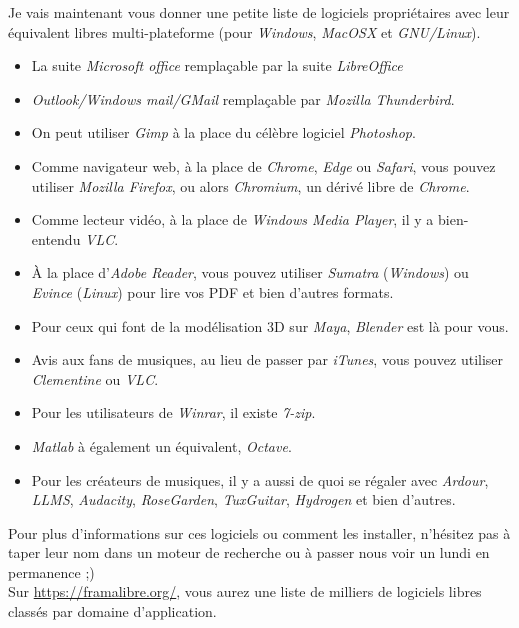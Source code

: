 \documentclass[10pt]{../fiche}
\begin{document}
Je vais maintenant vous donner une petite liste de logiciels propriétaires avec
leur équivalent libres multi-plateforme (pour \textit{Windows}, \textit{MacOSX}
et \textit{GNU/Linux}).
\begin{itemize}
    \item La suite \textit{Microsoft office} remplaçable par la suite \textit{LibreOffice}
    \item \textit{Outlook/Windows mail/GMail} remplaçable par \textit{Mozilla Thunderbird}.
    \item On peut utiliser \textit{Gimp} à la place du célèbre logiciel \textit{Photoshop}.
    \item Comme navigateur web, à la place de \textit{Chrome}, \textit{Edge} ou
        \textit{Safari}, vous pouvez utiliser \textit{Mozilla Firefox}, ou
        alors \textit{Chromium}, un dérivé libre de \textit{Chrome}.
    \item Comme lecteur vidéo, à la place de \textit{Windows Media Player}, il y a bien-entendu \textit{VLC}.
    \item À la place d'\textit{Adobe Reader}, vous pouvez utiliser
        \textit{Sumatra} (\textit{Windows}) ou \textit{Evince} (\textit{Linux})
        pour lire vos PDF et bien d'autres formats.
    \item Pour ceux qui font de la modélisation 3D sur \textit{Maya}, \textit{Blender} est là pour vous.
    \item Avis aux fans de musiques, au lieu de passer par \textit{iTunes}, vous pouvez utiliser \textit{Clementine} ou \textit{VLC}.
    \item Pour les utilisateurs de \textit{Winrar}, il existe \textit{7-zip}.
    \item \textit{Matlab} à également un équivalent, \textit{Octave}.
    \item Pour les créateurs de musiques, il y a aussi de quoi se régaler avec
        \textit{Ardour}, \textit{LLMS}, \textit{Audacity}, \textit{RoseGarden},
        \textit{TuxGuitar}, \textit{Hydrogen} et bien d'autres.
\end{itemize}
Pour plus d'informations sur ces logiciels ou comment les installer, n'hésitez
pas à taper leur nom dans un moteur de recherche ou à passer nous voir un lundi
en permanence ;)\\ Sur \url{https://framalibre.org/}, vous aurez une liste
de milliers de logiciels libres classés par domaine d'application.
\end{document}
